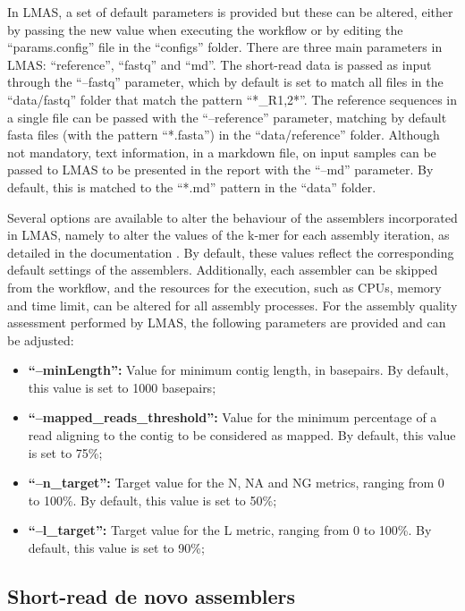 In LMAS, a set of default parameters is provided but these can be altered, either by passing the new value when executing the workflow or by editing the “params.config” file in the “configs” folder. There are three main parameters in LMAS: “reference”, “fastq” and “md”. The short-read data is passed as input through the “--fastq” parameter, which by default is set to match all files in the “data/fastq” folder that match the pattern “*\_R{1,2}*”. The reference sequences in a single file can be passed with the “--reference” parameter, matching by default fasta files (with the pattern “*.fasta”) in the “data/reference” folder. Although not mandatory, text information, in a markdown file, on input samples can be passed to LMAS to be presented in the report with the “--md” parameter. By default, this is matched to the “*.md” pattern in the “data” folder.  

Several options are available to alter the behaviour of the assemblers incorporated in LMAS, namely to alter the values of the k-mer for each assembly iteration, as detailed in the documentation \cite{}. By default, these values reflect the corresponding default settings of the assemblers. Additionally, each assembler can be skipped from the workflow, and the resources for the execution, such as CPUs, memory and time limit, can be altered for all assembly processes. For the assembly quality assessment performed by LMAS, the following parameters are provided and can be adjusted: 

\begin{itemize}
    \item \textbf{ “--minLength”:} Value for minimum contig length, in basepairs. By default, this value is set to 1000 basepairs;
    \item \textbf{“--mapped\_reads\_threshold”:} Value for the minimum percentage of a read aligning to the contig to be considered as mapped. By default, this value is set to 75\%;
    \item \textbf{“--n\_target”:} Target value for the N, NA and NG metrics, ranging from 0 to 100\%. By default, this value is set to 50\%;
    \item \textbf{“--l\_target”:} Target value for the L metric, ranging from 0 to 100\%. By default, this value is set to 90\%;
\end{itemize}

\subsection{Short-read de novo assemblers} \label{ch5_sup_assemblers}

